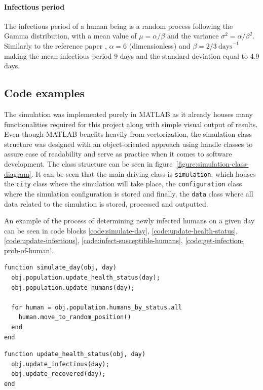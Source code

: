 \documentclass[a4paper]{article}
\newcommand{\code}{\texttt}
\begin{document}
\paragraph{Infectious period}
The infectious period of a human being is a random process following the Gamma distribution, with a mean value of $\mu = \alpha/\beta$ and the variance $ \sigma^2 = \alpha/\beta^2$. Similarly to the reference paper \cite{Maltezos2021}, $\alpha = 6$ (dimensionless) and $\beta = 2/3\:\mathrm{days}^{-1}$ making the mean infectious period 9 days and the standard deviation equal to 4.9 days.



\subsection{Code examples}
The simulation was implemented purely in MATLAB as it already houses many functionalities required for this project along with simple visual output of results. Even though MATLAB benefits heavily from vectorization, the simulation class structure was designed with an object-oriented approach using handle classes to assure ease of readability and serve as practice when it comes to software development. The class structure can be seen in figure~\ref{figure:simulation-class-diagram}. It can be seen that the main driving class is \code{simulation}, which houses the \code{city} class where the simulation will take place, the \code{configuration} class where the simulation configuration is stored and finally, the \code{data} class where all data related to the simulation is stored, processed and outputted.

An example of the process of determining newly infected humans on a given day can be seen in code blocks \ref{code:simulate-day}, \ref{code:update-health-status}, \ref{code:update-infectious}, \ref{code:infect-susceptible-humans}, \ref{code:get-infection-prob-of-human}.

\begin{lstlisting}[caption={Function for simulating one day, where \code{obj} is \code{city}.}, label={code:simulate-day}]
function simulate_day(obj, day)	
  obj.population.update_health_status(day);
  obj.population.update_humans(day);
	
  for human = obj.population.humans_by_status.all
    human.move_to_random_position()
  end
end
\end{lstlisting}


\begin{lstlisting}[caption={Function for updating the health status of the population on a given day, where \code{obj} is \code{population}.}, label={code:update-health-status}]
function update_health_status(obj, day)		
  obj.update_infectious(day);
  obj.update_recovered(day);
end
\end{lstlisting}
\end{document}

